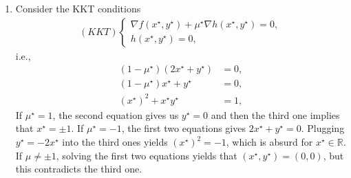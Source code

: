 \documentclass[a4paper]{article}
\numberwithin{equation}{section}
\begin{document}
\begin{enumerate}
\item Consider the KKT conditions
\begin{align}
\left( {KKT} \right)\left\{ \begin{array}{l}
\nabla f\left( {{x^\star },{y^\star }} \right) + {\mu ^\star }\nabla h\left( {{x^\star },{y^\star }} \right) = 0,\\
h\left( {{x^\star },{y^\star }} \right) = 0,
\end{array} \right. 
\end{align}
i.e., 
\begin{align}
\left( {1 - {\mu ^\star }} \right)\left( {2{x^\star } + {y^\star }} \right) &= 0,\\
\left( {1 - {\mu ^\star }} \right){x^\star } + {y^\star } &= 0,\\
{\left( {{x^\star }} \right)^2} + {x^\star }{y^\star } &= 1,
\end{align}
If $\mu ^\star =1$, the second equation gives us $y^\star =0$ and then the third one implies that $x^\star =\pm 1$. If $\mu ^\star =-1$, the first two equations gives $2x^\star +y^\star =0$. Plugging $y^\star =-2x^\star$ into the third ones yields ${\left( {{x^\star}} \right)^2} =  - 1$, which is absurd for $x^\star \in \mathbb{R}$. If $\mu \ne \pm 1$, solving the first two equations yields that $\left(x^\star,y^\star\right)=\left(0,0\right)$, but this contradicts the third one. 


\end{enumerate}
\end{document}
